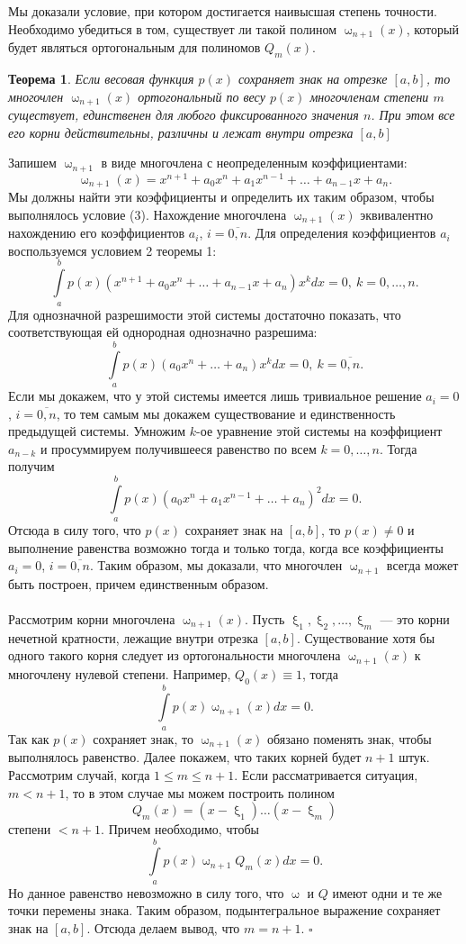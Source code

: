 \documentclass[a4paper, 12pt]{report}
\numberwithin{equation}{section}
\newenvironment{Proof} %
{\par\noindent{$\blacklozenge$}} %
{\hfill$\scriptstyle\square$}
\renewcommand{\leq}{\leqslant}
\renewcommand{\omega}{\upomega}
\renewcommand{\xi}{\upxi}
\newtheorem*{theorem}{Теорема}
\begin{document}
	 	\\\\
	 	Мы доказали условие, при котором достигается наивысшая степень точности. Необходимо убедиться в том, существует ли такой полином $\omega_{n+1}(x)$, который будет являться ортогональным для полиномов $Q_m(x)$.
	 	\begin{theorem}
	 		Если весовая функция $p(x)$ сохраняет знак на отрезке $[a,b]$, то многочлен $\omega_{n+1}(x)$ ортогональный по весу $p(x)$ многочленам степени $m$ существует, единственен для любого фиксированного значения $n$. При этом все его корни действительны, различны и лежат внутри отрезка $[a,b]$	 	\end{theorem}
	\begin{Proof}
		Запишем $\omega_{n+1}$ в виде многочлена с неопределенным коэффициентами: $$\omega_{n+1}(x) = x^{n+1} + a_0x^n + a_1x^{n-1} + \ldots + a_{n-1}x+a_n.$$
		Мы должны найти эти коэффициенты и определить их таким образом, чтобы выполнялось условие (3). Нахождение многочлена $\omega_{n+1}(x)$ эквивалентно нахождению его коэффициентов $a_i$, $i=\overline{0,n}$. Для определения коэффициентов $a_i$ воспользуемся условием 2 теоремы 1:
		$$\int\limits_a^b p(x)(x^{n+1} + a_0x^n + \ldots + a_{n-1}x+a_n) x^k dx= 0,\ k=0,\ldots,n.$$
		Для однозначной разрешимости этой системы достаточно показать, что соответствующая ей однородная однозначно разрешима:
		$$\int\limits_a^b p(x)(a_0x^n + \ldots +a_n) x^k dx= 0,\ k=\overline{0,n}.$$
		Если мы докажем, что у этой системы имеется лишь тривиальное решение $a_i = 0$, $i=\overline{0,n}$, то тем самым мы докажем существование и единственность предыдущей системы. Умножим $k$-ое уравнение этой системы на коэффициент $a_{n-k}$ и просуммируем получившееся равенство по всем $k=0,\ldots,n$. Тогда получим $$\int\limits_a^b p(x) (a_0x^n + a_1x^{n-1} + \ldots + a_n)^2dx = 0.$$
		Отсюда в силу того, что $p(x)$ сохраняет знак на $[a,b]$, то $p(x)\ne 0$ и выполнение равенства возможно тогда и только тогда, когда все коэффициенты $a_i =0$, $i=\overline{0,n}$. Таким образом, мы доказали, что многочлен $\omega_{n+1}$ всегда может быть построен, причем единственным образом.\\\\
		Рассмотрим корни многочлена $\omega_{n+1}(x)$. Пусть $\xi_1,\xi_2,\ldots,\xi_m$ --- это корни нечетной кратности, лежащие внутри отрезка $[a,b]$. Существование хотя бы одного такого корня следует из ортогональности многочлена $\omega_{n+1}(x)$ к многочлену нулевой степени. Например, $Q_0(x) \equiv 1$, тогда $$\int\limits_a^b p(x)\omega_{n+1}(x)dx = 0.$$
		Так как $p(x)$  сохраняет знак, то $\omega_{n+1}(x)$ обязано поменять знак, чтобы выполнялось равенство. Далее покажем, что таких корней будет $n+1$ штук. Рассмотрим случай, когда $1 \leq m \leq n+1$. Если рассматривается ситуация, $m < n+1$, то в этом случае мы можем построить полином $$Q_m(x)=(x-\xi_1)\ldots (x-\xi_m)$$ степени $<n+1$. Причем необходимо, чтобы $$\int\limits_a^b p(x)\omega_{n+1}Q_m(x)dx = 0.$$ Но данное равенство невозможно в силу того, что $\omega$ и $Q$ имеют одни и те же точки перемены знака. Таким образом, подынтегральное выражение сохраняет знак на $[a,b]$. Отсюда делаем вывод, что $m = n+1$.
	\end{Proof}\\\\
\end{document}
